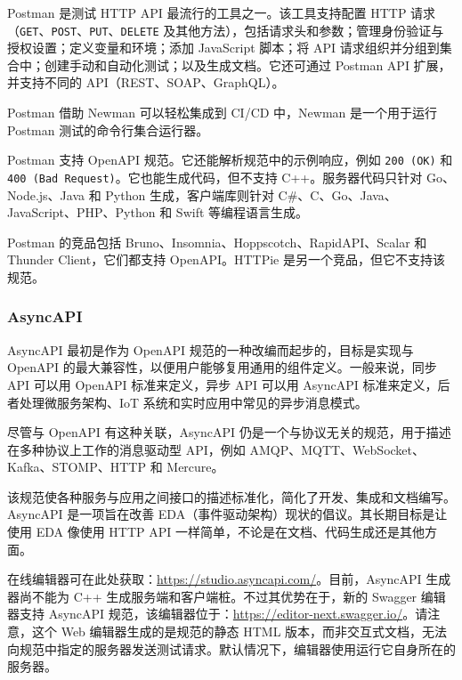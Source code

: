 \label{idx:1672}
Postman 是测试 HTTP API 最流行的工具之一。该工具支持配置 HTTP 请求（\texttt{GET}、\texttt{POST}、\texttt{PUT}、\texttt{DELETE} 及其他方法），包括请求头和参数；管理身份验证与授权设置；定义变量和环境；添加 JavaScript 脚本；将 API 请求组织并分组到集合中；创建手动和自动化测试；以及生成文档。它还可通过 Postman API 扩展，并支持不同的 API（REST、SOAP、GraphQL）。

Postman 借助 Newman 可以轻松集成到 CI/CD 中，Newman 是一个用于运行 Postman 测试的命令行集合运行器。


Postman 支持 OpenAPI 规范。它还能解析规范中的示例响应，例如 \texttt{200 (OK)} 和 \texttt{400 (\allowbreak{}Bad Request)\allowbreak{}}。它也能生成代码，但不支持 C++。服务器代码只针对 Go、Node.js、Java 和 Python 生成，客户端库则针对 C\#、C、Go、Java、JavaScript、PHP、Python 和 Swift 等编程语言生成。

\label{idx:1673}
\label{idx:1674}
Postman 的竞品包括 Bruno、Insomnia、Hoppscotch、RapidAPI、Scalar 和 Thunder Client，它们都支持 OpenAPI。HTTPie 是另一个竞品，但它不支持该规范。

\subsubsection{AsyncAPI}

\label{idx:1675}
\label{idx:1676}
AsyncAPI 最初是作为 OpenAPI 规范的一种改编而起步的，目标是实现与 OpenAPI 的最大兼容性，以便用户能够复用通用的组件定义。一般来说，同步 API 可以用 OpenAPI 标准来定义，异步 API 可以用 AsyncAPI 标准来定义，后者处理微服务架构、IoT 系统和实时应用中常见的异步消息模式。

尽管与 OpenAPI 有这种关联，AsyncAPI 仍是一个与协议无关的规范，用于描述在多种协议上工作的消息驱动型 API，例如 AMQP、MQTT、WebSocket、Kafka、STOMP、HTTP 和 Mercure。

该规范使各种服务与应用之间接口的描述标准化，简化了开发、集成和文档编写。AsyncAPI 是一项旨在改善 EDA（事件驱动架构）现状的倡议。其长期目标是让使用 EDA 像使用 HTTP API 一样简单，不论是在文档、代码生成还是其他方面。

在线编辑器可在此处获取：\href{https://studio.asyncapi.com/}{https://studio.asyncapi.com/}。目前，AsyncAPI 生成器尚不能为 C++ 生成服务端和客户端桩。不过其优势在于，新的 Swagger 编辑器支持 AsyncAPI 规范，该编辑器位于：\href{https://editor-next.swagger.io/}{https://editor-next.swagger.io/}。请注意，这个 Web 编辑器生成的是规范的静态 HTML 版本，而非交互式文档，无法向规范中指定的服务器发送测试请求。默认情况下，编辑器使用运行它自身所在的服务器。

